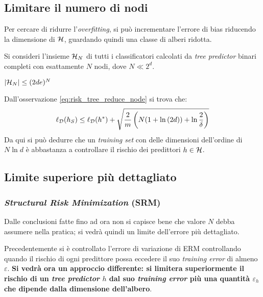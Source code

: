 \subsection{Limitare il numero di nodi}
Per cercare di ridurre l'\textit{overfitting}, si può incrementare l'errore di bias
riducendo la dimensione di $\mathcal{H}$, guardando quindi una classe di alberi ridotta.

Si consideri l'insieme $\mathcal{H}_N$ di tutti i classificatori calcolati da
\textit{tree predictor} binari completi con esattamente $N$ nodi, dove $N\ll 2^d$.

\begin{observation}\label{eq:risk_tree_reduce_node}
    $|\mathcal{H}_N| \leq (2de)^N$
\end{observation}

Dall'osservazione \ref{eq:risk_tree_reduce_node} si trova che:
$$ \ell_{\mathcal{D}}(h_S) \leq \ell_{\mathcal{D}}(h^*)
+\sqrt{\frac{2}{m}\left(N(1+\ln{(2d)})+\ln{\frac{2}{\delta}}\right)} $$
Da qui si può dedurre che un \textit{training set} con delle dimensioni dell'ordine
di $N\ln{d}$ è abbastanza a controllare il rischio dei predittori $h\in\mathcal{H}$.

\subsection{Limite superiore più dettagliato}
\subsubsection{\textit{Structural Risk Minimization} (SRM)}
Dalle conclusioni fatte fino ad ora non si capisce bene che valore $N$ debba assumere
nella pratica; si vedrà quindi un limite dell'errore più dettagliato.

Precedentemente si è controllato l'errore di variazione di ERM controllando quando
il rischio di ogni predittore possa eccedere il suo \textit{training error} di almeno
$\varepsilon$. \textbf{Si vedrà ora un approccio differente: si limitera superiormente
il rischio di un \textit{tree predictor} $h$ dal suo \textit{training error} più una
quantità $\varepsilon_h$ che dipende dalla dimensione dell'albero}.


